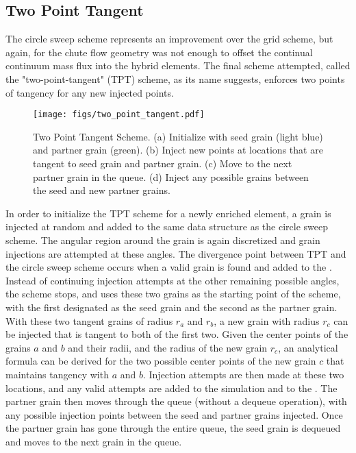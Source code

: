 \subsection{Two Point Tangent}
The circle sweep scheme represents an improvement over the grid scheme, but again, for the chute flow geometry was not enough to offset the continual continuum mass flux into the hybrid elements. The final scheme attempted, called the "two-point-tangent" (TPT) scheme, as its name suggests, enforces two points of tangency for any new injected points. 

\begin{figure}[htp] 
    \centering
    \texttt{[image: figs/two\_point\_tangent.pdf]}
    \caption{Two Point Tangent Scheme. (a) Initialize with seed grain (light blue) and  partner grain (green). (b) Inject new points at locations that are tangent to seed grain and partner grain. (c) Move to the next partner grain in the queue. (d) Inject any possible grains between the seed and new partner grains.}
    \label{two_tangent_enrichment}
\end{figure}

In order to initialize the TPT scheme for a newly enriched element, a grain is injected at random and added to the same \seed data structure as the circle sweep scheme. The angular region around the grain is again discretized and grain injections are attempted at these angles. The divergence point between TPT and the circle sweep scheme occurs when a valid grain is found and added to the \seed. Instead of continuing injection attempts at the other remaining possible angles, the scheme stops, and uses these two grains as the starting point of the scheme, with the first designated as the seed grain and the second as the partner grain. With these two tangent grains of radius $r_a$ and $r_b$, a new grain with radius $r_c$ can be injected that is tangent to both of the first two. Given the center points of the grains $a$ and $b$ and their radii, and the radius of the new grain $r_c$, an analytical formula can be derived for the two possible center points of the new grain $c$ that maintains tangency with $a$ and $b$. Injection attempts are then made at these two locations, and any valid attempts are added to the simulation and to the \seed. The partner grain then moves through the queue (without a dequeue operation), with any possible injection points between the seed and partner grains injected. Once the partner grain has gone through the entire queue, the seed grain is dequeued and moves to the next grain in the queue.

